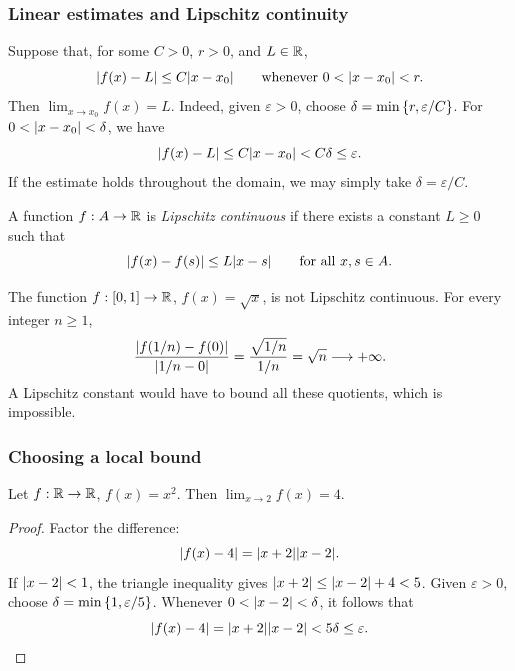 \documentclass[11pt,a4paper]{amsart}
\begin{document}
\subsubsection{Linear estimates and Lipschitz continuity}

\begin{example}
  Suppose that, for some \(C>0\), \(r>0\), and \(L\in\mathbb{R}\),
  \[
    \lvert f(x)-L\rvert\leq C\lvert x-x_0\rvert
    \qquad\text{whenever }0<\lvert x-x_0\rvert<r.
  \]
  Then \(\lim_{x\to x_0}f(x)=L\). Indeed, given \(\varepsilon>0\),
  choose \(\delta=\min\left\lbrace r,\varepsilon/C\right\rbrace\). For
  \(0<\lvert x-x_0\rvert<\delta\), we have
  \[
    \lvert f(x)-L\rvert\leq C\lvert x-x_0\rvert<C\delta\leq\varepsilon.
  \]
  If the estimate holds throughout the domain, we may simply take
  \(\delta=\varepsilon/C\).
\end{example}

\begin{definition}
  A function \(f:A\to\mathbb{R}\) is \emph{Lipschitz continuous} if there
  exists a constant \(L\geq0\) such that
  \[
    \lvert f(x)-f(s)\rvert\leq L\lvert x-s\rvert
    \qquad\text{for all }x,s\in A.
  \]
\end{definition}

\begin{example}
  The function \(f:[0,1]\to\mathbb{R}\), \(f(x)=\sqrt{x}\), is not
  Lipschitz continuous. For every integer \(n\geq1\),
  \[
    \frac{\lvert f(1/n)-f(0)\rvert}{\lvert1/n-0\rvert}
    =\frac{\sqrt{1/n}}{1/n}
    =\sqrt{n}\longrightarrow+\infty.
  \]
  A Lipschitz constant would have to bound all these quotients, which
  is impossible.
\end{example}

\subsubsection{Choosing a local bound}

\begin{example}
  Let \(f:\mathbb{R}\to\mathbb{R}\), \(f(x)=x^2\). Then
  \(\lim_{x\to2}f(x)=4\).
\end{example}

\begin{proof}
  Factor the difference:
  \[
    \lvert f(x)-4\rvert=\lvert x+2\rvert\lvert x-2\rvert.
  \]
  If \(\lvert x-2\rvert<1\), the triangle inequality gives
  \(\lvert x+2\rvert\leq\lvert x-2\rvert+4<5\).
  Given \(\varepsilon>0\), choose
  \(\delta=\min\left\lbrace1,\varepsilon/5\right\rbrace\). Whenever
  \(0<\lvert x-2\rvert<\delta\), it follows that
  \[
    \lvert f(x)-4\rvert=\lvert x+2\rvert\lvert x-2\rvert<5\delta\leq\varepsilon.
  \]
\end{proof}
\end{document}
